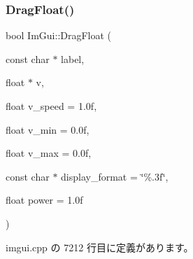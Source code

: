 \subsubsection{\texorpdfstring{Drag\+Float()}{DragFloat()}}
{\footnotesize\ttfamily bool Im\+Gui\+::\+Drag\+Float (\begin{DoxyParamCaption}\item[{const char $\ast$}]{label,  }\item[{float $\ast$}]{v,  }\item[{float}]{v\+\_\+speed = {\ttfamily 1.0f},  }\item[{float}]{v\+\_\+min = {\ttfamily 0.0f},  }\item[{float}]{v\+\_\+max = {\ttfamily 0.0f},  }\item[{const char $\ast$}]{display\+\_\+format = {\ttfamily \char`\"{}\%.3f\char`\"{}},  }\item[{float}]{power = {\ttfamily 1.0f} }\end{DoxyParamCaption})}



 imgui.\+cpp の 7212 行目に定義があります。

